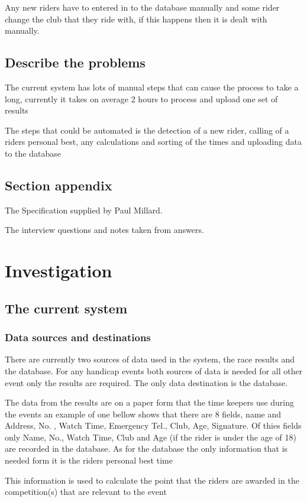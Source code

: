 Any new riders have to entered in to the database manually and some rider change the club that they ride with, if this happens then it is dealt with manually.
\subsection{Describe the problems}
The current system has lots of manual steps that can cause the process to take a long, currently it takes on average 2 hours to process and upload one set of results

The steps that could be automated is the detection of a new rider, calling of a riders personal best, any calculations and sorting of the times and uploading data to the database
\subsection{Section appendix}

The Specification supplied by Paul Millard.


The interview questions and notes taken from answers.
\section{Investigation}

\subsection{The current system}

\subsubsection{Data sources and destinations}
There are currently two sources of data used in the system, the race results and the database. For any handicap events both sources of data is needed for all other event only the results are required. The only data destination is the database.

The data from the results are on a paper form that the time keepers use during the events an example of one bellow shows that there are 8 fields, name and Address, No. , Watch Time, Emergency Tel., Club, Age, Signature. Of thies fields only Name, No., Watch Time, Club and Age (if the rider is under the age of 18) are recorded in the database. As for the database the only information that is needed form it is the riders personal best time

This information is used to calculate the point that the riders are awarded in the competition(s) that are relevant to the event

